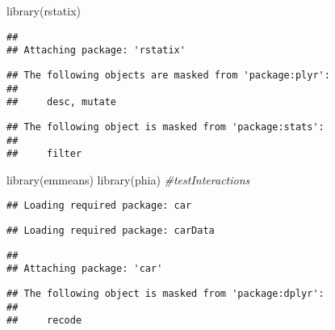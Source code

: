 \documentclass[
]{article}
\newenvironment{Shaded}{\begin{snugshade}}{\end{snugshade}}
\newcommand{\CommentTok}[1]{\textcolor[rgb]{0.56,0.35,0.01}{\textit{#1}}}
\newcommand{\FunctionTok}[1]{\textcolor[rgb]{0.00,0.00,0.00}{#1}}
\newcommand{\NormalTok}[1]{#1}
\begin{document}
\begin{Shaded}
\begin{Highlighting}[]
\FunctionTok{library}\NormalTok{(rstatix)}
\end{Highlighting}
\end{Shaded}

\begin{verbatim}
## 
## Attaching package: 'rstatix'
\end{verbatim}

\begin{verbatim}
## The following objects are masked from 'package:plyr':
## 
##     desc, mutate
\end{verbatim}

\begin{verbatim}
## The following object is masked from 'package:stats':
## 
##     filter
\end{verbatim}

\begin{Shaded}
\begin{Highlighting}[]
\FunctionTok{library}\NormalTok{(emmeans)}
\FunctionTok{library}\NormalTok{(phia)       }\CommentTok{\#testInteractions}
\end{Highlighting}
\end{Shaded}

\begin{verbatim}
## Loading required package: car
\end{verbatim}

\begin{verbatim}
## Loading required package: carData
\end{verbatim}

\begin{verbatim}
## 
## Attaching package: 'car'
\end{verbatim}

\begin{verbatim}
## The following object is masked from 'package:dplyr':
## 
##     recode
\end{verbatim}
\end{document}
